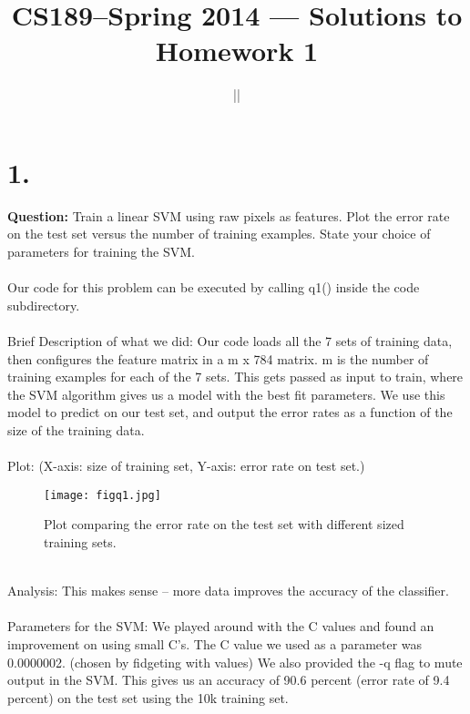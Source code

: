 \documentclass[11pt]{article}
\title{CS189--Spring 2014 --- Solutions to Homework 1}
\author{\NameA || \NameB}
\begin{document}
\maketitle

\section*{1.} 
\textbf{Question:} Train a linear SVM using raw pixels as features. Plot the error rate on the test set versus the number of training examples. State your choice of parameters for training the SVM.
\\\\
Our code for this problem can be executed by calling q1() inside the code subdirectory.
\\\\
Brief Description of what we did: Our code loads all the 7 sets of training data, then configures the feature matrix in a m x 784 matrix. m is the number of training examples for each of the 7 sets. This gets passed as input to train, where the SVM algorithm gives us a model with the best fit parameters. We use this model to predict on our test set, and output the error rates as a function of the size of the training data.
\\\\
Plot: (X-axis: size of training set, Y-axis: error rate on test set.)
\begin{figure}[ht!]
\centering
\texttt{[image: figq1.jpg]}
\caption{Plot comparing the error rate on the test set with different sized training sets.}
\label{overflow}
\end{figure}
\\
Analysis: This makes sense -- more data improves the accuracy of the classifier.
\\\\
Parameters for the SVM: We played around with the C values and found an improvement on using small C's. The C value we used as a parameter was 0.0000002. (chosen by fidgeting with values) We also provided the -q flag to mute output in the SVM. This gives us an accuracy of 90.6 percent (error rate of 9.4 percent) on the test set using the 10k training set.
\newpage
\end{document}
